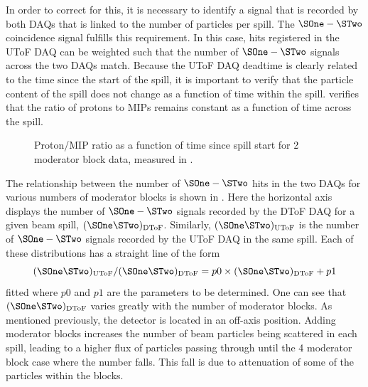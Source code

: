 In order to correct for this, it is necessary to identify a signal that is recorded by both DAQs that is linked to the number of particles per spill.
The $\SOne-\STwo$ coincidence signal fulfills this requirement.
In this case, hits registered in the UToF DAQ can be weighted such that the number of $\SOne-\STwo$ signals across the two DAQs match.
Because the UToF DAQ deadtime is clearly related to the time since the start of the spill, it is important to verify that the particle content of the spill does not change as a function of time within the spill.
 verifies that the ratio of protons to MIPs remains constant as a function of time across the spill.

\begin{figure}[h]
  \begin{adjustbox}{max totalsize=.75\textwidth, center}
    
  \end{adjustbox}
  \caption[Proton/MIP ratio as a function of time since spill start]{Proton/MIP ratio as a function of time since spill start for 2 moderator block data, measured in \SFour.}
  \label{fig:proMipRatio}
\end{figure}

The relationship between the number of $\SOne-\STwo$ hits in the two DAQs for various numbers of moderator blocks is shown in .
Here the horizontal axis displays the number of $\SOne-\STwo$ signals recorded by the DToF DAQ for a given beam spill, $(\SOne\STwo)_{\text{DToF}}$.
Similarly, $(\SOne\STwo)_{\text{UToF}}$ is the number of $\SOne-\STwo$ signals recorded by the UToF DAQ in the same spill.
Each of these distributions has a straight line of the form
\begin{equation}
  (\SOne\STwo)_{\text{UToF}}/(\SOne\STwo)_{\text{DToF}} = p0 \times (\SOne\STwo)_{\text{DToF}} + p1
\end{equation}
fitted where $p0$ and $p1$ are the parameters to be determined.
One can see that $(\SOne \STwo)_{\text{DToF}}$ varies greatly with the number of moderator blocks. 
As mentioned previously, the \STwo detector is located in an off-axis position.
Adding moderator blocks increases the number of beam particles being scattered in each spill, leading to a higher flux of particles passing through \STwo until the 4 moderator block case where the number falls.
This fall is due to attenuation of some of the particles within the blocks.

